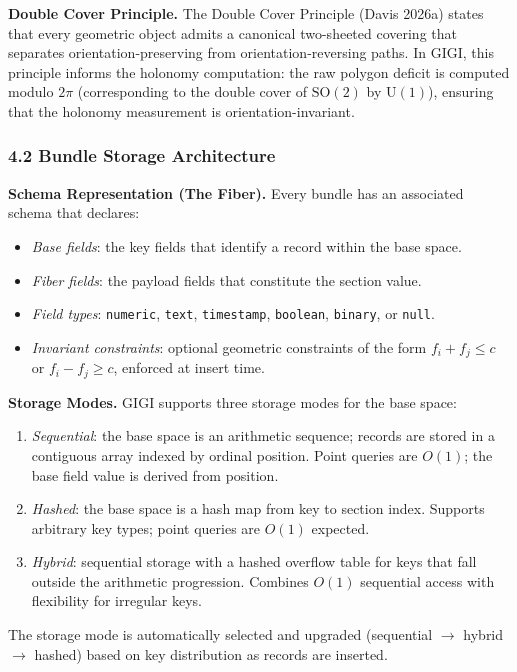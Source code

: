 \documentclass[11pt,letterpaper]{article}
\begin{document}
\textbf{Double Cover Principle.} The Double Cover Principle (Davis 2026a) states that every geometric object admits a canonical two-sheeted covering that separates orientation-preserving from orientation-reversing paths. In GIGI, this principle informs the holonomy computation: the raw polygon deficit is computed modulo $2\pi$ (corresponding to the double cover of $\mathrm{SO}(2)$ by $\mathrm{U}(1)$), ensuring that the holonomy measurement is orientation-invariant.


\subsubsection*{4.2 Bundle Storage Architecture}

\textbf{Schema Representation (The Fiber).} Every bundle has an associated schema that declares:
\begin{itemize}[nosep]
  \item \emph{Base fields}: the key fields that identify a record within the base space.
  \item \emph{Fiber fields}: the payload fields that constitute the section value.
  \item \emph{Field types}: \texttt{numeric}, \texttt{text}, \texttt{timestamp}, \texttt{boolean}, \texttt{binary}, or \texttt{null}.
  \item \emph{Invariant constraints}: optional geometric constraints of the form $f_i + f_j \leq c$ or $f_i - f_j \geq c$, enforced at insert time.
\end{itemize}

\textbf{Storage Modes.} GIGI supports three storage modes for the base space:
\begin{enumerate}[nosep]
  \item \emph{Sequential}: the base space is an arithmetic sequence; records are stored in a contiguous array indexed by ordinal position. Point queries are $O(1)$; the base field value is derived from position.
  \item \emph{Hashed}: the base space is a hash map from key to section index. Supports arbitrary key types; point queries are $O(1)$ expected.
  \item \emph{Hybrid}: sequential storage with a hashed overflow table for keys that fall outside the arithmetic progression. Combines $O(1)$ sequential access with flexibility for irregular keys.
\end{enumerate}
The storage mode is automatically selected and upgraded (sequential $\to$ hybrid $\to$ hashed) based on key distribution as records are inserted.
\end{document}

